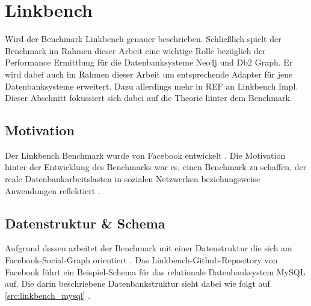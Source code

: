 \section{Linkbench}

Wird der Benchmark Linkbench genauer beschrieben. Schließlich spielt der Benchmark im Rahmen dieser Arbeit eine wichtige Rolle bezüglich der Performance Ermittlung für die Datenbanksysteme Neo4j und Db2 Graph. Er wird dabei auch im Rahmen dieser Arbeit um entsprechende Adapter für jene Datenbanksysteme erweitert. Dazu allerdings mehr in REF an Linkbench Impl. Dieser Abschnitt fokussiert sich dabei auf die Theorie hinter dem Benchmark. 

\subsection{Motivation}
Der Linkbench Benchmark wurde von Facebook entwickelt \cite{linkbench_paper}. Die Motivation hinter der Entwicklung des Benchmarks war es, einen Benchmark zu schaffen, der reale Datenbankarbeitslasten in sozialen Netzwerken beziehungsweise Anwendungen reflektiert \cite{linkbench_paper}. 

\subsection{Datenstruktur \& Schema}
Aufgrund dessen arbeitet der Benchmark mit einer Datenstruktur die sich am Facebook-Social-Graph orientiert \cite{linkbench_paper}. Das Linkbench-Github-Repository \cite{fb_linkbench_github} von Facebook führt ein Beispiel-Schema für das relationale Datenbanksystem MySQL auf. Die darin beschriebene Datenbankstruktur sieht dabei wie folgt auf \autoref{src:linkbench_mysql} \cite{fb_linkbench_github}. 

